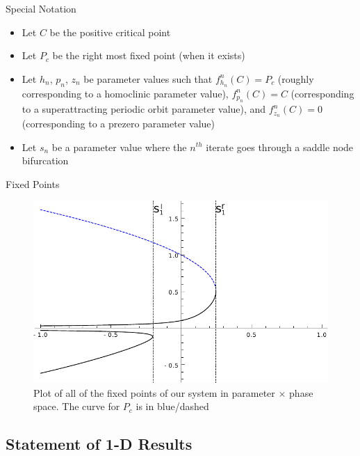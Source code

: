 \documentclass{beamer}
\newcommand{\<}{\left\langle}
\renewcommand{\>}{\right\rangle} %
\renewcommand{\*}{\cdot} %
\newcommand{\pr}{h^{CrP_c}_2}
\begin{document}
\begin{frame}{Special Notation}
\begin{itemize}
		\item Let $C$ be the positive critical point
		\item Let $P_c$ be the right most fixed point (when it exists)
		\item Let $h_n$, $p_n$, $z_n$ be parameter values such that $f^n_{h_n} (C) = P_c$ (roughly corresponding to a homoclinic parameter value), $f^n_{p_n} (C) = C$ (corresponding to a superattracting periodic orbit parameter value), and $f^n_{z_n} (C) = 0$ (corresponding to a prezero parameter value) %
		\item Let $s_n$ be a parameter value where the $n^{th}$ iterate goes through a saddle node bifurcation
	\end{itemize}
\end{frame}

\begin{frame}{Fixed Points}
	\begin{figure}
		\centering
		\includegraphics[width=.8\textwidth]{./img/pc}
		\caption{Plot of all of the fixed points of our system in parameter $\times$ phase space. The curve for $P_c$ is in blue/dashed}
	\end{figure}
\end{frame}

\subsection{Statement of 1-D Results}
\end{document}
